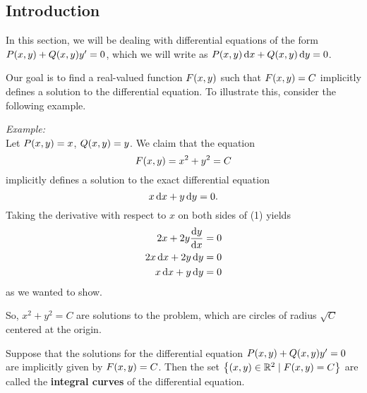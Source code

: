 \subsection{Introduction}
In this section, we will be dealing with differential equations of the form $P\p{x, y} + Q\p{x, y}y' = 0$, which we will write as $P\p{x, y}\,\diff{x} + Q\p{x, y}\,\diff{y} = 0$.

Our goal is to find a real-valued function $F\p{x, y}$ such that $F\p{x, y} = C$ implicitly defines a solution to the differential equation. To illustrate this, consider the following example.

\textit{Example:} \\
Let $P\p{x, y} = x$, $Q\p{x, y} = y$. We claim that the equation
\begin{equation}
	F\p{x, y} = x^2 + y^2 = C	
\end{equation}
implicitly defines a solution to the exact differential equation
\[
	x\,\mathrm{d}x + y\,\mathrm{d}y = 0.
\]
Taking the derivative with respect to $x$ on both sides of (1) yields
\begin{align*}
	2x + 2y\frac{\mathrm{d}y}{\mathrm{d}x} &= 0 \\
	2x\,\mathrm{d}x + 2y\,\mathrm{d}y &= 0 \\
	x\,\mathrm{d}x + y\,\mathrm{d}y &= 0
\end{align*}
as we wanted to show.

So, $x^2 + y^2 = C$ are solutions to the problem, which are circles of radius $\sqrt{C}$ centered at the origin.

\begin{definition}
	Suppose that the solutions for the differential equation $P\p{x, y} + Q\p{x, y}y' = 0$ are implicitly given by $F\p{x, y} = C$. Then the set $\left\{\p{x, y} \in \mathbb{R}^2 \mid F\p{x, y} = C \right\}$ are called the \textbf{integral curves} of the differential equation.	
\end{definition}

